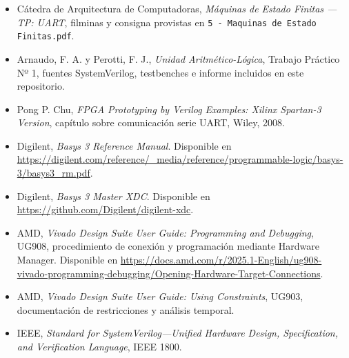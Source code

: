 \begin{itemize}
    \raggedright
  \item Cátedra de Arquitectura de Computadoras, \textit{Máquinas de Estado
    Finitas --- TP: UART}, filminas y consigna provistas en
    \texttt{5 - Maquinas de Estado Finitas.pdf}.
  \item Arnaudo, F. A. y Perotti, F. J., \textit{Unidad
    Aritmético-Lógica}, Trabajo Práctico Nº 1, fuentes SystemVerilog,
    testbenches e informe incluidos en este repositorio.
  \item Pong P. Chu, \textit{FPGA Prototyping by Verilog Examples:
    Xilinx Spartan-3 Version}, capítulo sobre comunicación serie UART,
    Wiley, 2008.
  \item Digilent, \textit{Basys 3 Reference Manual}. Disponible en
    \url{https://digilent.com/reference/_media/reference/programmable-logic/basys-3/basys3_rm.pdf}.
  \item Digilent, \textit{Basys 3 Master XDC}. Disponible en
    \url{https://github.com/Digilent/digilent-xdc}.
  \item AMD, \textit{Vivado Design Suite User Guide: Programming and
    Debugging}, UG908, procedimiento de conexión y programación mediante
    Hardware Manager. Disponible en
    \url{https://docs.amd.com/r/2025.1-English/ug908-vivado-programming-debugging/Opening-Hardware-Target-Connections}.
  \item AMD, \textit{Vivado Design Suite User Guide: Using Constraints},
    UG903, documentación de restricciones y análisis temporal.
  \item IEEE, \textit{Standard for SystemVerilog---Unified Hardware Design,
    Specification, and Verification Language}, IEEE 1800.
\end{itemize}
